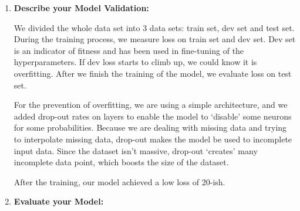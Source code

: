 \documentclass[11pt, a4paper]{article}
\begin{document}
\begin{enumerate}
	\item {\textbf{Describe your Model Validation:}}
	\par{We divided the whole data set into 3 data sets: train set, dev set and test set. During the training process, we measure loss on train set and dev set. Dev set is an indicator of fitness and has been used in fine-tuning of the hyperparameters. If dev loss starts to climb up, we could know it is overfitting. After we finish the training of the model, we evaluate loss on test set.}
	\par{For the prevention of overfitting, we are using a simple architecture, and we added drop-out rates on layers to enable the model to `disable' some neurons for some probabilities. Because we are dealing with missing data and trying to interpolate missing data, drop-out makes the model be used to incomplete input data. Since the dataset isn't massive, drop-out `creates' many incomplete data point, which boosts the size of the dataset.}
	\par{After the training, our model achieved a low loss of 20-ish.}
	
	\item {\textbf{Evaluate your Model:}}
	
	

\end{enumerate}
\end{document}

